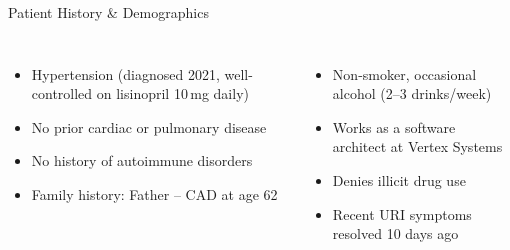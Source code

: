 \documentclass[10pt,aspectratio=169]{beamer}
\begin{document}
\begin{frame}{Patient History \& Demographics}
  \vspace{0.3cm}

  \begin{tcolorbox}[infobox,title={\faHistory\hspace{4pt}Past Medical \& Social History}]
    \small
    \begin{columns}[T]
      \begin{itemize}
        \item Hypertension (diagnosed 2021, well-controlled on lisinopril 10\,mg daily)
        \item No prior cardiac or pulmonary disease
        \item No history of autoimmune disorders
        \item Family history: Father -- CAD at age 62
      \end{itemize}
      \begin{itemize}
        \item Non-smoker, occasional alcohol (2--3 drinks/week)
        \item Works as a software architect at Vertex Systems
        \item Denies illicit drug use
        \item Recent URI symptoms resolved 10 days ago
      \end{itemize}
    \end{columns}
  \end{tcolorbox}
\end{frame}
\end{document}
